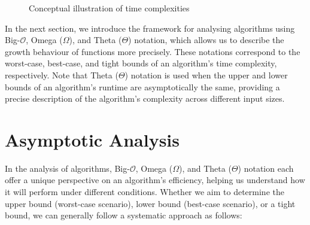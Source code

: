\begin{figure}[htbp]
    \centering
    \caption{Conceptual illustration of time complexities}
    \label{fig:time_complexities}
\end{figure}

In the next section, we introduce the framework for analysing algorithms using Big-$\mathcal{O}$, Omega ($\Omega$), and Theta ($\Theta$) notation, which allows us to describe the growth behaviour of functions more precisely. These notations correspond to the worst-case, best-case, and tight bounds of an algorithm's time complexity, respectively. Note that Theta ($\Theta$) notation is used when the upper and lower bounds of an algorithm's runtime are asymptotically the same, providing a precise description of the algorithm's complexity across different input sizes.


\section{Asymptotic Analysis}
In the analysis of algorithms, Big-$\mathcal{O}$, Omega ($\Omega$), and Theta ($\Theta$) notation each offer a unique perspective on an algorithm's efficiency, helping us understand how it will perform under different conditions. Whether we aim to determine the upper bound (worst-case scenario), lower bound (best-case scenario), or a tight bound, we can generally follow a systematic approach as follows:

